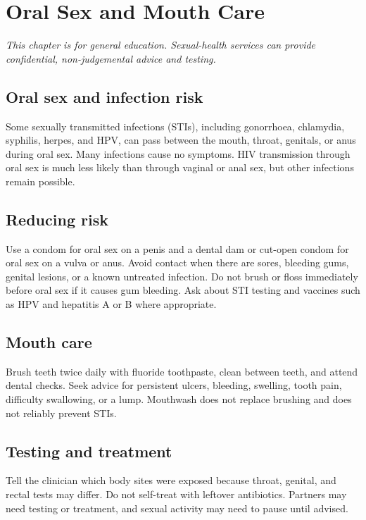 \chapter{Oral Sex and Mouth Care}

\medskip
\noindent\textit{This chapter is for general education. Sexual-health services can provide confidential, non-judgemental advice and testing.}

\section*{Oral sex and infection risk}
Some sexually transmitted infections (STIs), including gonorrhoea, chlamydia, syphilis, herpes, and HPV, can pass between the mouth, throat, genitals, or anus during oral sex. Many infections cause no symptoms. HIV transmission through oral sex is much less likely than through vaginal or anal sex, but other infections remain possible.

\section*{Reducing risk}
Use a condom for oral sex on a penis and a dental dam or cut-open condom for oral sex on a vulva or anus. Avoid contact when there are sores, bleeding gums, genital lesions, or a known untreated infection. Do not brush or floss immediately before oral sex if it causes gum bleeding. Ask about STI testing and vaccines such as HPV and hepatitis A or B where appropriate.

\section*{Mouth care}
Brush teeth twice daily with fluoride toothpaste, clean between teeth, and attend dental checks. Seek advice for persistent ulcers, bleeding, swelling, tooth pain, difficulty swallowing, or a lump. Mouthwash does not replace brushing and does not reliably prevent STIs.

\section*{Testing and treatment}
Tell the clinician which body sites were exposed because throat, genital, and rectal tests may differ. Do not self-treat with leftover antibiotics. Partners may need testing or treatment, and sexual activity may need to pause until advised.

